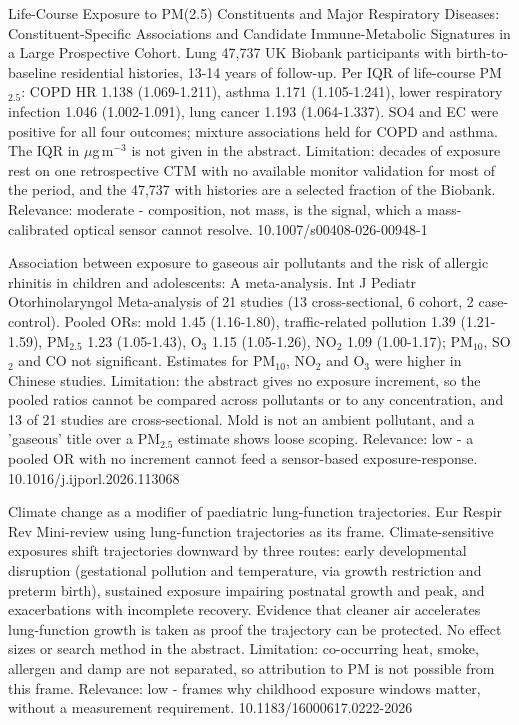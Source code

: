 \documentclass[10pt]{article}
\begin{document}
\par{}\baselineskip{}\baselineskip
{}

{Life-Course Exposure to PM(2.5) Constituents and Major Respiratory Diseases: Constituent-Specific Associations and Candidate Immune-Metabolic Signatures in a Large Prospective Cohort.}
{Lung}
{47,737 UK Biobank participants with birth-to-baseline residential histories, 13-14 years of follow-up. Per IQR of life-course PM$_{2.5}$: COPD HR 1.138 (1.069-1.211), asthma 1.171 (1.105-1.241), lower respiratory infection 1.046 (1.002-1.091), lung cancer 1.193 (1.064-1.337). SO4 and EC were positive for all four outcomes; mixture associations held for COPD and asthma. The IQR in $\mu$g\,m$^{-3}$ is not given in the abstract. Limitation: decades of exposure rest on one retrospective CTM with no available monitor validation for most of the period, and the 47,737 with histories are a selected fraction of the Biobank. Relevance: moderate - composition, not mass, is the signal, which a mass-calibrated optical sensor cannot resolve.}
{10.1007/s00408-026-00948-1}

{Association between exposure to gaseous air pollutants and the risk of allergic rhinitis in children and adolescents: A meta-analysis.}
{Int J Pediatr Otorhinolaryngol}
{Meta-analysis of 21 studies (13 cross-sectional, 6 cohort, 2 case-control). Pooled ORs: mold 1.45 (1.16-1.80), traffic-related pollution 1.39 (1.21-1.59), PM$_{2.5}$ 1.23 (1.05-1.43), O$_3$ 1.15 (1.05-1.26), NO$_2$ 1.09 (1.00-1.17); PM$_{10}$, SO$_2$ and CO not significant. Estimates for PM$_{10}$, NO$_2$ and O$_3$ were higher in Chinese studies. Limitation: the abstract gives no exposure increment, so the pooled ratios cannot be compared across pollutants or to any concentration, and 13 of 21 studies are cross-sectional. Mold is not an ambient pollutant, and a 'gaseous' title over a PM$_{2.5}$ estimate shows loose scoping. Relevance: low - a pooled OR with no increment cannot feed a sensor-based exposure-response.}
{10.1016/j.ijporl.2026.113068}

{Climate change as a modifier of paediatric lung-function trajectories.}
{Eur Respir Rev}
{Mini-review using lung-function trajectories as its frame. Climate-sensitive exposures shift trajectories downward by three routes: early developmental disruption (gestational pollution and temperature, via growth restriction and preterm birth), sustained exposure impairing postnatal growth and peak, and exacerbations with incomplete recovery. Evidence that cleaner air accelerates lung-function growth is taken as proof the trajectory can be protected. No effect sizes or search method in the abstract. Limitation: co-occurring heat, smoke, allergen and damp are not separated, so attribution to PM is not possible from this frame. Relevance: low - frames why childhood exposure windows matter, without a measurement requirement.}
{10.1183/16000617.0222-2026}
\end{document}
